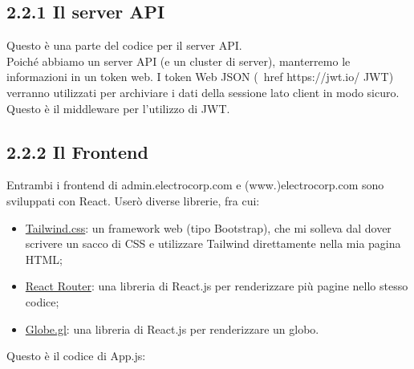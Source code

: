 \subsection*{2.2.1 \hspace{1cm} Il server API}
Questo è una parte del codice per il server API. \\


Poiché abbiamo un server API (e un cluster di server), manterremo le informazioni in un token web. I token Web JSON (\ href {https://jwt.io/} {JWT}) verranno utilizzati per archiviare i dati della sessione lato client in modo sicuro. \\
Questo è il middleware per l'utilizzo di JWT. \\




\subsection*{2.2.2 \hspace{1cm} Il Frontend}
Entrambi i frontend di admin.electrocorp.com e (www.)electrocorp.com sono sviluppati con React.
Userò diverse librerie, fra cui:
\begin{itemize}
    \item \href{https://tailwindcss.com/}{Tailwind.css}: un framework web (tipo Bootstrap), che mi solleva dal dover scrivere un sacco di CSS e utilizzare Tailwind direttamente nella mia pagina HTML;
    \item \href{https://reactrouter.com/}{React Router}: una libreria di React.js per renderizzare più pagine nello stesso codice;
    \item \href{https://globe.gl}{Globe.gl}: una libreria di React.js per renderizzare un globo.
\end{itemize}

Questo è il codice di App.js:
